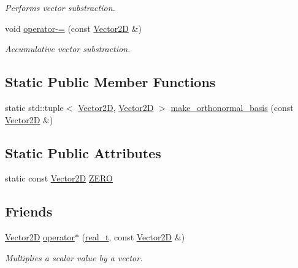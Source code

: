 \begin{DoxyCompactItemize}
\begin{DoxyCompactList}\small\item\em Performs vector substraction. \end{DoxyCompactList}\item 
void \hyperlink{class_designar_1_1_vector2_d_a47923d4edc621e324d793df3ac2678a7}{operator-\/=} (const \hyperlink{class_designar_1_1_vector2_d}{Vector2D} \&)
\begin{DoxyCompactList}\small\item\em Accumulative vector substraction. \end{DoxyCompactList}\end{DoxyCompactItemize}
\subsection*{Static Public Member Functions}
\begin{DoxyCompactItemize}
\item 
static std\+::tuple$<$ \hyperlink{class_designar_1_1_vector2_d}{Vector2D}, \hyperlink{class_designar_1_1_vector2_d}{Vector2D} $>$ \hyperlink{class_designar_1_1_vector2_d_a794f762b2d8cdce1ff429e1049440b5b}{make\+\_\+orthonormal\+\_\+basis} (const \hyperlink{class_designar_1_1_vector2_d}{Vector2D} \&)
\end{DoxyCompactItemize}
\subsection*{Static Public Attributes}
\begin{DoxyCompactItemize}
\item 
static const \hyperlink{class_designar_1_1_vector2_d}{Vector2D} \hyperlink{class_designar_1_1_vector2_d_a69058a422d5a1317e1047949f01cc131}{Z\+E\+RO}
\end{DoxyCompactItemize}
\subsection*{Friends}
\begin{DoxyCompactItemize}
\item 
\hyperlink{class_designar_1_1_vector2_d}{Vector2D} \hyperlink{class_designar_1_1_vector2_d_aca9e39dbbbc406c5d35f20b4628b8391}{operator$\ast$} (\hyperlink{namespace_designar_aca2c32af26808dbec1f3a3071fad25ce}{real\+\_\+t}, const \hyperlink{class_designar_1_1_vector2_d}{Vector2D} \&)
\begin{DoxyCompactList}\small\item\em Multiplies a scalar value by a vector. \end{DoxyCompactList}\end{DoxyCompactItemize}
